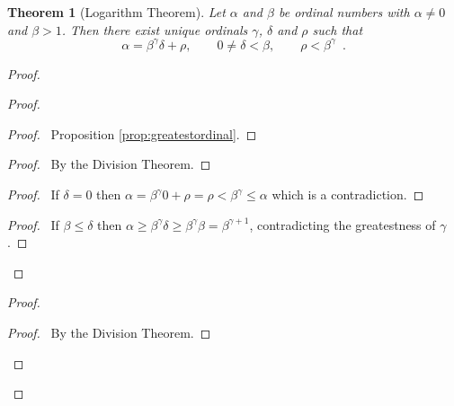 \documentclass{book}
\let\qed\relax
\newtheorem{thm}[ax]{Theorem}
\theoremstyle{definition}
\begin{document}
\begin{thm}[Logarithm Theorem]
Let $\alpha$ and $\beta$ be ordinal numbers with $\alpha \neq 0$ and $\beta > 1$. Then there exist unique ordinals $\gamma$, $\delta$ and $\rho$ such that
\[ \alpha = \beta^\gamma \delta + \rho, \qquad 0 \neq \delta < \beta, \qquad \rho < \beta^\gamma \enspace . \]
\end{thm}

\begin{proof}
\pf
{}
\begin{proof}
	\begin{proof}
		\pf\ Proposition \ref{prop:greatestordinal}.
	\end{proof}
	\begin{proof}
		\pf\ By the Division Theorem.
	\end{proof}
	\begin{proof}
		\pf\ If $\delta = 0$ then $\alpha = \beta^\gamma 0 + \rho = \rho < \beta^\gamma \leq \alpha$ which is a contradiction.
	\end{proof}
	\begin{proof}
		\pf\ If $\beta \leq \delta$ then $\alpha \geq \beta^\gamma \delta \geq \beta^\gamma \beta = \beta^{\gamma + 1}$, contradicting the greatestness of $\gamma$.
	\end{proof}
\end{proof}
\begin{proof}
	\begin{proof}
		\pf\ By the Division Theorem.
	\end{proof}
\end{proof}
\qed
\end{proof}
\end{document}
